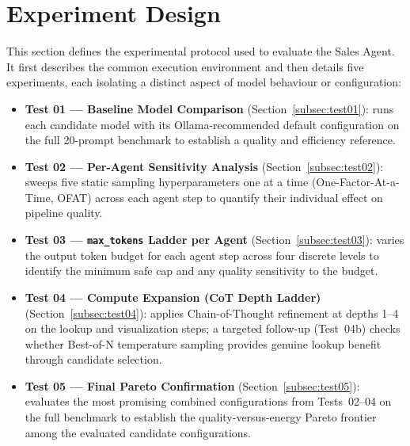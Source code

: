 \section{Experiment Design}
\label{sec:experimentdesign}

This section defines the experimental protocol used to evaluate the Sales
Agent. It first describes the common execution environment and then details
five experiments, each isolating a distinct aspect of model behaviour or
configuration:

\begin{itemize}
    \item \textbf{Test 01 --- Baseline Model Comparison}
          (Section~\ref{subsec:test01}): runs each candidate
          model with its Ollama-recommended default configuration on the full
          20-prompt benchmark to establish a quality and efficiency reference.
    \item \textbf{Test 02 --- Per-Agent Sensitivity Analysis}
          (Section~\ref{subsec:test02}): sweeps five
          static sampling hyperparameters one at a time (One-Factor-At-a-Time,
          OFAT) across each agent step to quantify their individual effect on
          pipeline quality.
    \item \textbf{Test 03 --- \texttt{max\_tokens} Ladder per Agent}
          (Section~\ref{subsec:test03}): varies
          the output token budget for each agent step across four discrete
          levels to identify the minimum safe cap and any quality sensitivity
          to the budget.
    \item \textbf{Test 04 --- Compute Expansion (CoT Depth Ladder)}
          (Section~\ref{subsec:test04}): applies
          Chain-of-Thought refinement at depths 1--4 on the lookup and
          visualization steps; a targeted follow-up (Test~04b) checks whether
          Best-of-N temperature sampling provides genuine lookup benefit
          through candidate selection.
    \item \textbf{Test 05 --- Final Pareto Confirmation}
          (Section~\ref{subsec:test05}): evaluates the most
          promising combined configurations from Tests~02--04 on the full
          benchmark to establish the quality-versus-energy Pareto
          frontier among the evaluated candidate configurations.
\end{itemize}

